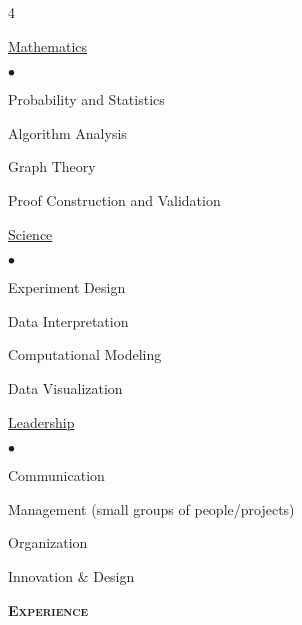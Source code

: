 \documentclass{article}
\newcommand{\lineunder}{\vspace*{-8pt} \\ \hspace*{-18pt} \hrulefill \\}
\newcommand{\header}[1]{{\vspace*{8pt}\hspace*{-16pt} \textsc{\textbf{\large{#1}}}} \vspace*{4pt} \lineunder \vspace*{4pt}}
\newcommand{\skilltype}[1]{{\large \underline{#1}} \vspace{3pt} \\}
\newenvironment{skilllist}{\begin{list}{$\bullet$}{\topsep 0pt \itemsep -2pt}}{\vspace*{4pt}\end{list}}
\begin{document}
\begin{multicols}{4}
        
        
        
        \vspace{7pt}
    \columnbreak
        
    \skilltype{Mathematics}
        \begin{skilllist}
            \item Probability and Statistics
            \item Algorithm Analysis
            \item Graph Theory
            \item Proof Construction and Validation
        \end{skilllist}
        
        
    
    \skilltype{Science}
        \begin{skilllist}
        \item Experiment Design
        \item Data Interpretation
        \item Computational Modeling
        \item Data Visualization
        
        \end{skilllist}
        
    \columnbreak

    \skilltype{Leadership}
    
        \begin{skilllist}
            \item Communication
            \item Management (small groups of people/projects)
            \item Organization
            \item Innovation $\&$ Design
        \end{skilllist}
        
        \vspace{2pt}
    
    
\end{multicols}

\vspace{-14pt}


\header{Experience}
\end{document}
